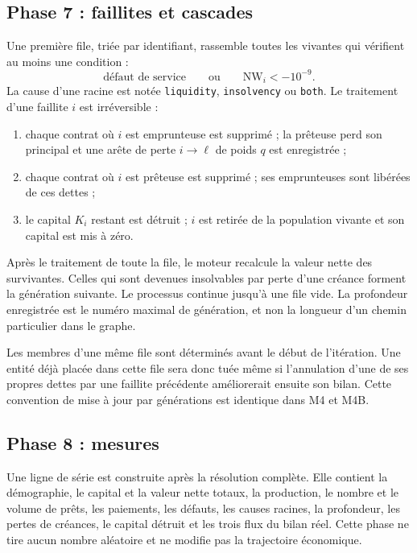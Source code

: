 \documentclass[11pt,a4paper]{article}
\newcommand{\code}[1]{\texttt{#1}}
\newcommand{\NW}{\mathrm{NW}}
\begin{document}
\subsection{Phase 7 : faillites et cascades}

Une première file, triée par identifiant, rassemble toutes les vivantes qui
vérifient au moins une condition :
\[
\text{défaut de service}
\qquad\text{ou}\qquad
\NW_i<-10^{-9}.
\]
La cause d'une racine est notée \code{liquidity}, \code{insolvency} ou
\code{both}. Le traitement d'une faillite $i$ est irréversible :

\begin{enumerate}
\item chaque contrat où $i$ est emprunteuse est supprimé ; la prêteuse perd
  son principal et une arête de perte $i\rightarrow\ell$ de poids $q$ est
  enregistrée ;
\item chaque contrat où $i$ est prêteuse est supprimé ; ses emprunteuses sont
  libérées de ces dettes ;
\item le capital $K_i$ restant est détruit ; $i$ est retirée de la population
  vivante et son capital est mis à zéro.
\end{enumerate}

Après le traitement de toute la file, le moteur recalcule la valeur nette des
survivantes. Celles qui sont devenues insolvables par perte d'une créance
forment la génération suivante. Le processus continue jusqu'à une file vide.
La profondeur enregistrée est le numéro maximal de génération, et non la
longueur d'un chemin particulier dans le graphe.

Les membres d'une même file sont déterminés avant le début de l'itération.
Une entité déjà placée dans cette file sera donc tuée même si l'annulation
d'une de ses propres dettes par une faillite précédente améliorerait ensuite
son bilan. Cette convention de mise à jour par générations est identique dans
M4 et M4B.

\subsection{Phase 8 : mesures}

Une ligne de série est construite après la résolution complète. Elle contient
la démographie, le capital et la valeur nette totaux, la production, le
nombre et le volume de prêts, les paiements, les défauts, les causes racines,
la profondeur, les pertes de créances, le capital détruit et les trois flux
du bilan réel. Cette phase ne tire aucun nombre aléatoire et ne modifie pas
la trajectoire économique.
\end{document}
